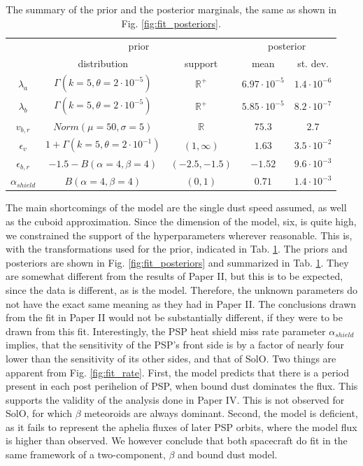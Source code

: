 \begin{table}[t]
\caption{The summary of the prior and the posterior marginals, the same as shown in Fig. \ref{fig:fit_posteriors}.}
\centering
\label{tab:prior_posterior}
\begin{tabular}{c|cc|cc}
\multicolumn{1}{c}{  } \vline & \multicolumn{2}{c}{prior} \vline & \multicolumn{2}{c}{posterior} \\ 
& distribution & support & mean & st. dev. \\
\hline
$\lambda_a$ & $\Gamma(k=5,\theta=2\cdot10^{-5})$ & $\mathbb{R}^+$ &
$6.97 \cdot 10^{-5}$ & $1.4 \cdot 10^{-6}$  \\
$\lambda_b$ & $\Gamma(k=5,\theta=2\cdot10^{-5})$ & $\mathbb{R}^+$ & 
$5.85 \cdot 10^{-5}$ & $8.2 \cdot 10^{-7}$  \\
$v_{b,r}$ & $Norm(\mu=50,\sigma=5)$ & $\mathbb{R}$ & 
$75.3$ & $2.7$  \\
$\epsilon_v$ & $1+\Gamma(k=5,\theta=2\cdot10^{-1})$ & $(1,\infty)$ &
$1.63$ & $3.5 \cdot 10^{-2}$  \\
$\epsilon_{b,r}$ & $-1.5-B(\alpha=4,\beta=4)$ & $(-2.5,-1.5)$ &
$-1.52$ & $9.6 \cdot 10^{-3}$  \\
$\alpha_{shield}$ & $B(\alpha=4,\beta=4)$ & $(0,1)$ & 
$0.71$ & $1.4 \cdot 10^{-3}$  \\
\hline
\end{tabular}
\end{table}

The main shortcomings of the model are the single dust speed assumed, as well as the cuboid approximation. Since the dimension of the model, six, is quite high, we constrained the support of the hyperparameters wherever reasonable. This is, with the transformations used for the prior, indicated in Tab. \ref{tab:prior_posterior}. The priors and posteriors are shown in Fig. \ref{fig:fit_posteriors} and summarized in Tab. \ref{tab:prior_posterior}. They are somewhat different from the results of Paper II, but this is to be expected, since the data is different, as is the model. Therefore, the unknown parameters do not have the exact same meaning as they had in Paper II. The conclusions drawn from the fit in Paper II would not be substantially different, if they were to be drawn from this fit. Interestingly, the PSP heat shield miss rate parameter $\alpha_{shield}$ implies, that the sensitivity of the PSP's front side is by a factor of nearly four lower than the sensitivity of its other sides, and that of SolO. Two things are apparent from Fig. \ref{fig:fit_rate}. First, the model predicts that there is a period present in each post perihelion of PSP, when bound dust dominates the flux. This supports the validity of the analysis done in Paper IV. This is not observed for SolO, for which $\beta$ meteoroids are always dominant. Second, the model is deficient, as it fails to represent the aphelia fluxes of later PSP orbits, where the model flux is higher than observed. We however conclude that both spacecraft do fit in the same framework of a two-component, $\beta$ and bound dust model. 

